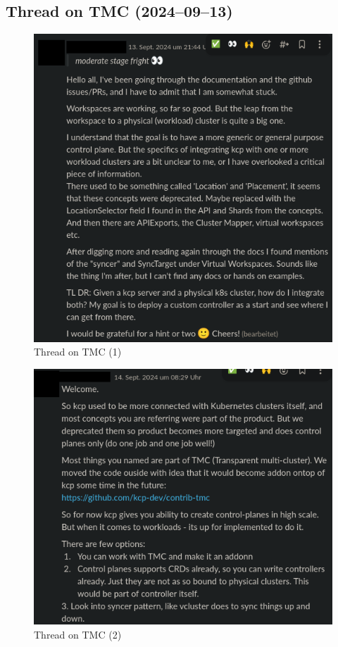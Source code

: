 \documentclass[11pt, a4paper, oneside, listof=totoc]{scrartcl}
\begin{document}
            \subsection{Thread on TMC (2024--09--13)}
                \begin{figure}[h!]
                    \centering
                    \includegraphics[width=\textwidth]{screenshots/slack/tmc1.anonymized.png}
                    \caption{Thread on TMC (1)}\label{fig:tmc1}
                \end{figure}

                \begin{figure}[h!]
                    \centering
                    \includegraphics[width=\textwidth]{screenshots/slack/tmc2.anonymized.png}
                    \caption{Thread on TMC (2)}\label{fig:tmc2}
                \end{figure}
\end{document}
